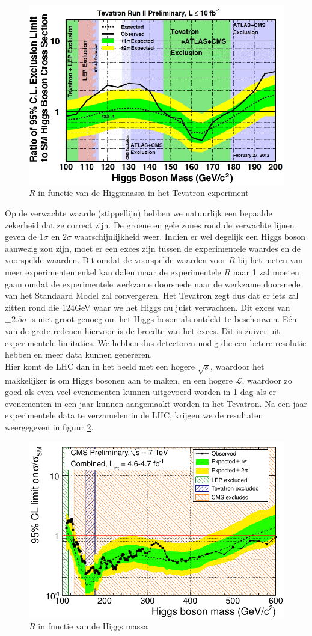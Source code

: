\documentclass[../main.tex]{subfiles}
\begin{document}
\begin{figure}[h]
    \centering
    \includegraphics[width=0.6\linewidth]{higgs_boson/zoektoacht_h_tevatron.png}
    \caption{$R$ in functie van de Higgsmassa in het Tevatron experiment}%
    \label{fig:higgs_boson/zoektoacht_h_tevatron}
\end{figure}

Op de verwachte waarde (stippellijn) hebben we natuurlijk een bepaalde zekerheid dat ze correct zijn. De groene en gele zones rond de verwachte lijnen geven de $1\sigma$ en $2\sigma$ waarschijnlijkheid weer. Indien er wel degelijk een Higgs boson aanwezig zou zijn, moet er een exces zijn tussen de experimentele waardes en de voorspelde waarden. Dit omdat de voorspelde waarden voor $R$ bij het meten van meer experimenten enkel kan dalen maar de experimentele $R$ naar 1 zal moeten gaan omdat de experimentele werkzame doorsnede naar de werkzame doorsnede van het Standaard Model zal convergeren. Het Tevatron zegt dus dat er iets zal zitten rond die $124$GeV waar we het Higgs nu juist verwachten. Dit exces van $\pm 2.5\sigma$ is niet groot genoeg om het Higgs boson als ontdekt te beschouwen. Eén van de grote redenen hiervoor is de breedte van het exces. Dit is zuiver uit experimentele limitaties. We hebben dus detectoren nodig die een betere resolutie hebben en meer data kunnen genereren.\\
Hier komt de LHC dan in het beeld met een hogere $\sqrt{s}$, waardoor het makkelijker is om Higgs bosonen aan te maken, en een hogere $\mathcal{L}$, waardoor zo goed als even veel evenementen kunnen uitgevoerd worden in 1 dag als er evenementen in een jaar kunnen aangemaakt worden in het Tevatron. Na een jaar experimentele data te verzamelen in de LHC, krijgen we de resultaten weergegeven in figuur \ref{fig:higgs_boson/zoektocht_naar_h}.

\begin{figure}[h]
    \centering
    \includegraphics[width=0.6\linewidth]{higgs_boson/zoektocht_naar_h.png}
    \caption{$R$ in functie van de Higgs massa}%
    \label{fig:higgs_boson/zoektocht_naar_h}
\end{figure}
\end{document}
